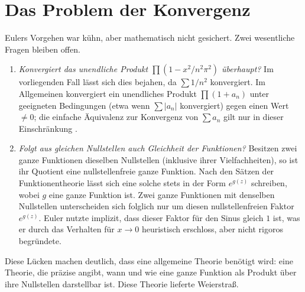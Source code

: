 \section{Das Problem der Konvergenz}

Eulers Vorgehen war kühn, aber mathematisch nicht gesichert.
Zwei wesentliche Fragen bleiben offen.

\begin{enumerate}
\item \emph{Konvergiert das unendliche Produkt
$\prod(1 - x^2/n^2\pi^2)$ überhaupt?}
%
Im vorliegenden Fall lässt sich dies bejahen, da $\sum 1/n^2$ konvergiert.
Im Allgemeinen konvergiert ein unendliches Produkt $\prod(1+a_n)$ unter
geeigneten Bedingungen (etwa wenn $\sum |a_n|$ konvergiert) gegen einen Wert $\neq 0$;
die einfache Äquivalenz zur Konvergenz von $\sum a_n$ gilt nur in dieser
Einschränkung \cite{produkt:remmert}.

\item \emph{Folgt aus gleichen Nullstellen auch Gleichheit der Funktionen?}
Besitzen zwei ganze Funktionen dieselben Nullstellen (inklusive ihrer Vielfachheiten),
so ist ihr Quotient eine nullstellenfreie ganze Funktion.
Nach den Sätzen der Funktionentheorie lässt sich eine solche stets in der Form
$e^{g(z)}$ schreiben, wobei $g$ eine ganze Funktion ist.
Zwei ganze Funktionen mit denselben Nullstellen unterscheiden sich folglich
nur um diesen nullstellenfreien Faktor $e^{g(z)}$.
Euler nutzte implizit, dass dieser Faktor für den Sinus gleich $1$ ist,
was er durch das Verhalten für $x \to 0$ heuristisch erschloss,
aber nicht rigoros begründete.
\end{enumerate}

Diese Lücken machen deutlich, dass eine allgemeine Theorie benötigt wird:
eine Theorie, die präzise angibt, wann und wie eine ganze Funktion als Produkt
über ihre Nullstellen darstellbar ist.
Diese Theorie lieferte Weierstraß.
